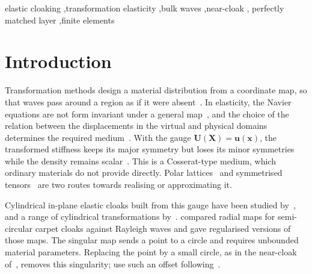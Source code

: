 \documentclass[preprint,12pt]{elsarticle}
\newcommand{\mbf}[1]{\mathbf{#1}}
\begin{document}
\begin{frontmatter}
\begin{keyword}
elastic cloaking \sep transformation elasticity \sep bulk waves \sep near-cloak \sep
perfectly matched layer \sep finite elements
\end{keyword}

\end{frontmatter}

\section{Introduction}\label{sec:intro}

Transformation methods design a material distribution from a coordinate map, so that waves pass
around a region as if it were absent~\citep{pendry2006}. In elasticity, the Navier equations are
not form invariant under a general map~\citep{milton2006}, and the choice of the relation between the
displacements in the virtual and physical domains determines the required
medium~\citep{norris2011}. With the gauge $\mbf{U}(\mbf{X})=\mbf{u}(\mbf{x})$, the transformed
stiffness keeps its major symmetry but loses its minor symmetries while the density remains
scalar~\citep{brun2009,norris2011}. This is a Cosserat-type medium, which ordinary materials do not
provide directly. Polar lattices~\citep{nassar2018} and symmetrised
tensors~\citep{chatzopoulos2023} are two routes towards realising or approximating it.

Cylindrical in-plane elastic cloaks built from this gauge have been studied
by~\citet{brun2009}, and a range of cylindrical transformations by~\citet{brun2023}.
\citet{chatzopoulos2023} compared radial maps for semi-circular carpet cloaks against Rayleigh
waves and gave regularised versions of those maps. The singular map sends a point to a circle and requires
unbounded material parameters. Replacing the point by a small circle, as in the near-cloak
of~\citet{kohn2008}, removes this singularity; \citet{chatzopoulos2023} use such an offset following~\citet{kohn2014}.
\end{document}
